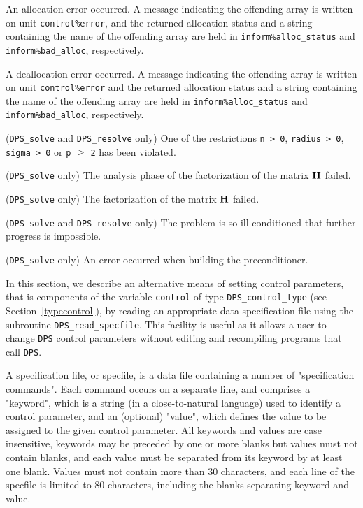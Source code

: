 \documentclass{galahad}
\newcommand{\packagename}{DPS}
\begin{document}
\begin{description}
 An allocation error occurred. A message indicating
the offending
array is written on unit {\tt control\%error}, and the returned allocation
status and a string containing the name of the offending array
are held in {\tt inform\%alloc\_\-status}
and {\tt inform\%bad\_alloc}, respectively.

 A deallocation error occurred.
A message indicating the offending
array is written on unit {\tt control\%error} and the returned allocation
status and a string containing the name of the offending array
are held in {\tt inform\%alloc\_\-status}
and {\tt inform\%bad\_alloc}, respectively.

 ({\tt \packagename\_solve} and
{\tt \packagename\_resolve} only)
One of the restrictions
{\tt n > 0},
{\tt radius > 0},
{\tt sigma > 0}
or
{\tt p} $\geq$ {\tt 2}
has been violated.

 ({\tt \packagename\_solve} only)
The analysis phase of the factorization of the matrix ${\mathbf{H}}$ failed.

 ({\tt \packagename\_solve} only)
The factorization of the matrix ${\mathbf{H}}$ failed.

 ({\tt \packagename\_solve} and
{\tt \packagename\_resolve} only)
The problem is so ill-conditioned that further progress is impossible.

 ({\tt \packagename\_solve} only)
 An error occurred when building the preconditioner.

\end{description}


\galfeatures
\noindent In this section, we describe an alternative means of setting
control parameters, that is components of the variable {\tt control} of type
{\tt \packagename\_control\_type}
(see Section~\ref{typecontrol}),
by reading an appropriate data specification file using the
subroutine {\tt \packagename\_read\_specfile}. This facility
is useful as it allows a user to change  {\tt \packagename} control parameters
without editing and recompiling programs that call {\tt \packagename}.

A specification file, or specfile, is a data file containing a number of
"specification commands". Each command occurs on a separate line,
and comprises a "keyword",
which is a string (in a close-to-natural language) used to identify a
control parameter, and
an (optional) "value", which defines the value to be assigned to the given
control parameter. All keywords and values are case insensitive,
keywords may be preceded by one or more blanks but
values must not contain blanks, and
each value must be separated from its keyword by at least one blank.
Values must not contain more than 30 characters, and
each line of the specfile is limited to 80 characters,
including the blanks separating keyword and value.
\end{document}
